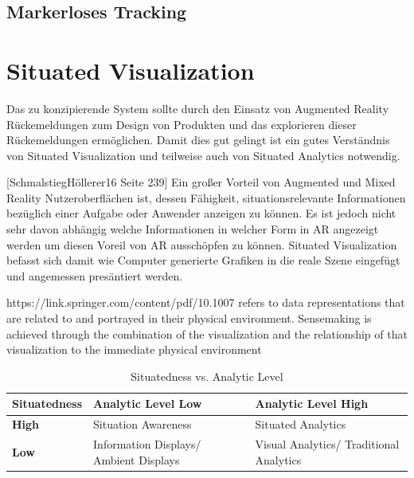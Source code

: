 
\subsection{Markerloses Tracking}



\section{Situated Visualization}

Das zu konzipierende System sollte durch den Einsatz von Augmented Reality Rückemeldungen zum Design von Produkten und das explorieren dieser Rückemeldungen ermöglichen. Damit dies gut gelingt 
ist ein gutes Verständnis von Situated Visualization und teilweise auch von Situated Analytics notwendig. 

[SchmalstiegHöllerer16 Seite 239] Ein großer Vorteil von Augmented und Mixed Reality Nutzeroberflächen ist,  dessen Fähigkeit, situationsrelevante Informationen bezüglich einer Aufgabe oder Anwender anzeigen zu können. 
Es ist jedoch nicht sehr davon abhängig welche Informationen in welcher Form in AR angezeigt werden um diesen Voreil von AR ausschöpfen zu können. Situated Visualization befasst sich damit wie Computer generierte Grafiken 
in die reale Szene eingefügt und angemessen presäntiert werden. 


https://link.springer.com/content/pdf/10.1007%
refers to data representations that are related to and portrayed in their physical environment. Sensemaking is achieved through the combination of the visualization and the relationship of that visualization to the immediate physical environment

\begin{table}[htbp]
\caption{Situatedness vs. Analytic Level}
	\begin{center}
		\begin{tabular}{|l|ll|}
		\hline
		\textbf{Situatedness}& \textbf{Analytic Level Low} & \textbf{Analytic Level High}\\
		\hline
		\textbf{High } & Situation Awareness & Situated Analytics \\
		\textbf{Low} & Information Displays/ Ambient Displays & Visual Analytics/ Traditional Analytics \\
		\hline
		\end{tabular}
	\end{center}
	\label{tab:categorycscw}
\end{table}


